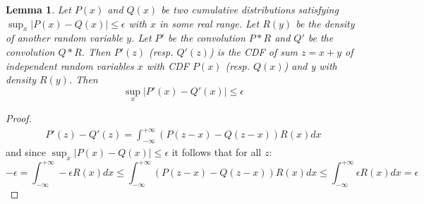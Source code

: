 \documentclass{article}
\newtheorem{lemma}{Lemma}
\begin{document}
\begin{lemma} Let $P(x)$ and $Q(x)$ be two cumulative distributions satisfying $\sup_x|P(x)-Q(x)|\leq \epsilon$ with
  $x$ in some real range. Let $R(y)$ be the {\em density} of another
  random variable $y$. Let $P'$ be the convolution $P*R$ and $Q'$ be
  the convolution $Q*R$. Then $P'(z)$ (resp. $Q'(z)$) is the CDF of sum
  $z=x+y$ of independent random variables $x$ with CDF $P(x)$ (resp. $Q(x)$) and y
  with density $R(y)$.  Then
  \begin{equation}
    \sup_x|P'(x)-Q'(x)|\leq \epsilon
  \end{equation}
  \end{lemma}
\begin{proof}
  \begin{equation}
    \begin{split}
      P'(z) - Q'(z) = \int_{-\infty}^{+\infty}(P(z-x)-Q(z-x))R(x) dx
    \end{split}
  \end{equation}
  and since $\sup_x|P(x)-Q(x)|\leq \epsilon$ it follows that for all $z$:
  \begin{equation}
- \epsilon = \int_{-\infty}^{+\infty} -\epsilon R(x) dx \leq \int_{-\infty}^{+\infty}(P(z-x)-Q(z-x))R(x) dx \leq \int_{-\infty}^{+\infty}\epsilon R(x) dx = \epsilon
  \end{equation}
\end{proof}
\end{document}
